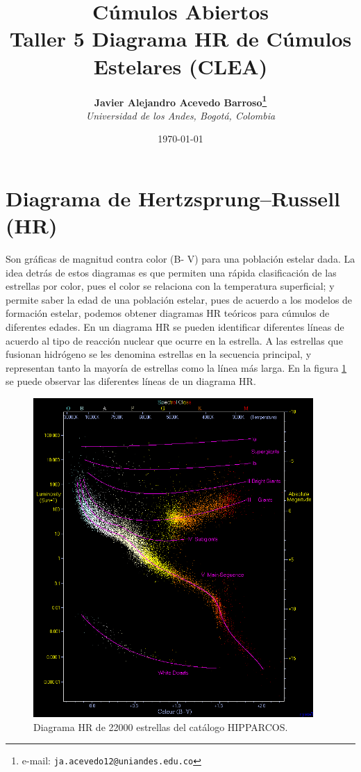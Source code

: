 \documentclass[12pt]{article}
\begin{document}
\title{Cúmulos Abiertos \\ Taller 5 Diagrama HR de Cúmulos Estelares (CLEA)}

\author{
\textbf{Javier Alejandro Acevedo Barroso\thanks{e-mail: \texttt{ja.acevedo12@uniandes.edu.co}}}\\
\textit{Universidad de los Andes, Bogotá, Colombia}\\
 }%

\date{\today}
\maketitle %


\normalsize
\newpage


\section{Diagrama de Hertzsprung–Russell (HR)}
Son gráficas de magnitud contra color (B- V) para una población estelar dada.
La idea detrás de estos diagramas es que permiten una rápida clasificación de las estrellas por color, pues el color se relaciona con la temperatura superficial; y permite saber la edad de una población estelar, pues de acuerdo a los modelos de formación estelar, podemos obtener diagramas HR teóricos para cúmulos de diferentes edades.
En un diagrama HR se pueden identificar diferentes líneas de acuerdo al tipo de reacción nuclear que ocurre en la estrella.
A las estrellas que fusionan hidrógeno se les denomina estrellas en la secuencia principal, y representan tanto la mayoría de estrellas como la línea más larga. En la figura \ref{diag} se puede observar las diferentes líneas de un diagrama HR.



\begin{figure}[H]
  \centering
   \includegraphics[width= 4.20in]{HRdiag.png}
  \caption{Diagrama HR de 22000 estrellas del catálogo HIPPARCOS.\cite{hrdiag}  }
  \label{diag}
\end{figure}
\end{document}
